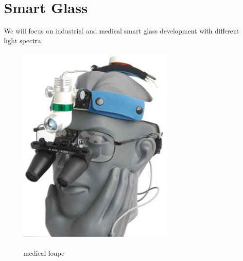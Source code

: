 \documentclass[a4paper,12pt]{article}
\begin{document}
\clearpage
\section{Smart Glass}
We will focus on industrial and medical smart glass development with different light spectra.

\begin{figure}[ht]
  \centering
	\includegraphics[width=0.7\textwidth, keepaspectratio=true]{medical-loupe-1}
  \caption{medical loupe}\cite{njnorth}
  \label{fig:medical-loupe}
\end{figure}


\clearpage
%
{}

%


 

\end{document}
